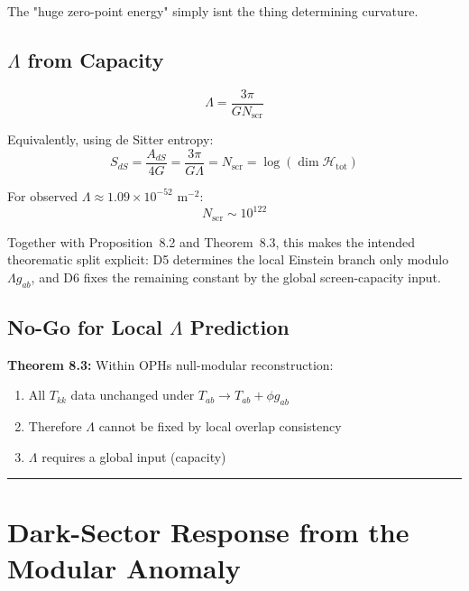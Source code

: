 The "huge zero-point energy" simply isn\textquotesingle t the thing determining curvature.

\subsection{\texorpdfstring{\(\Lambda\) from Capacity}{Lambda from Capacity}}\label{83-ux3bb-from-capacity}

\[\Lambda = \frac{3\pi}{G N_{\mathrm{scr}}}\]

Equivalently, using de Sitter entropy: \[S_{dS} = \frac{A_{dS}}{4G} = \frac{3\pi}{G\Lambda} = N_{\mathrm{scr}} = \log(\dim \mathcal{H}_{\text{tot}})\]

For observed \(\Lambda \approx 1.09 \times 10^{-52}\) m\(^{-2}\): \[N_{\mathrm{scr}} \sim 10^{122}\]

Together with Proposition~8.2 and Theorem~8.3, this makes the intended theorematic split explicit: D5 determines the local Einstein branch only modulo \(\Lambda g_{ab}\), and D6 fixes the remaining constant by the global screen-capacity input.

\subsection{\texorpdfstring{No-Go for Local \(\Lambda\) Prediction}{No-Go for Local Lambda Prediction}}\label{84-no-go-for-local-ux3bb-prediction}

\textbf{Theorem 8.3:} Within OPH\textquotesingle s null-modular reconstruction:

\begin{enumerate}
\def\labelenumi{\arabic{enumi}.}
\tightlist
\item
 All \(T_{kk}\) data unchanged under \(T_{ab} \to T_{ab} + \phi g_{ab}\)
\item
 Therefore \(\Lambda\) cannot be fixed by local overlap consistency
\item
 \(\Lambda\) requires a global input (capacity)
\end{enumerate}

\begin{center}\rule{0.5\linewidth}{0.5pt}\end{center}

\section{Dark-Sector Response from the Modular Anomaly}\label{9-dark-matter-as-modular-anomaly}

